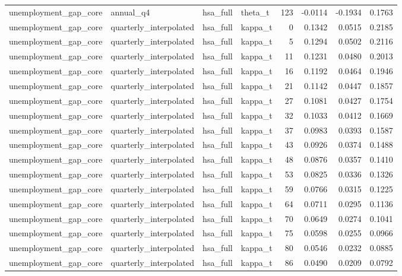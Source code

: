 \begin{tabular}{llllrrrr}
unemployment\_gap\_core & annual\_q4 & hsa\_full & theta\_t & 123 & -0.0114 & -0.1934 & 0.1763 \\
unemployment\_gap\_core & quarterly\_interpolated & hsa\_full & kappa\_t & 0 & 0.1342 & 0.0515 & 0.2185 \\
unemployment\_gap\_core & quarterly\_interpolated & hsa\_full & kappa\_t & 5 & 0.1294 & 0.0502 & 0.2116 \\
unemployment\_gap\_core & quarterly\_interpolated & hsa\_full & kappa\_t & 11 & 0.1231 & 0.0480 & 0.2013 \\
unemployment\_gap\_core & quarterly\_interpolated & hsa\_full & kappa\_t & 16 & 0.1192 & 0.0464 & 0.1946 \\
unemployment\_gap\_core & quarterly\_interpolated & hsa\_full & kappa\_t & 21 & 0.1142 & 0.0447 & 0.1857 \\
unemployment\_gap\_core & quarterly\_interpolated & hsa\_full & kappa\_t & 27 & 0.1081 & 0.0427 & 0.1754 \\
unemployment\_gap\_core & quarterly\_interpolated & hsa\_full & kappa\_t & 32 & 0.1033 & 0.0412 & 0.1669 \\
unemployment\_gap\_core & quarterly\_interpolated & hsa\_full & kappa\_t & 37 & 0.0983 & 0.0393 & 0.1587 \\
unemployment\_gap\_core & quarterly\_interpolated & hsa\_full & kappa\_t & 43 & 0.0926 & 0.0374 & 0.1488 \\
unemployment\_gap\_core & quarterly\_interpolated & hsa\_full & kappa\_t & 48 & 0.0876 & 0.0357 & 0.1410 \\
unemployment\_gap\_core & quarterly\_interpolated & hsa\_full & kappa\_t & 53 & 0.0825 & 0.0336 & 0.1326 \\
unemployment\_gap\_core & quarterly\_interpolated & hsa\_full & kappa\_t & 59 & 0.0766 & 0.0315 & 0.1225 \\
unemployment\_gap\_core & quarterly\_interpolated & hsa\_full & kappa\_t & 64 & 0.0711 & 0.0295 & 0.1136 \\
unemployment\_gap\_core & quarterly\_interpolated & hsa\_full & kappa\_t & 70 & 0.0649 & 0.0274 & 0.1041 \\
unemployment\_gap\_core & quarterly\_interpolated & hsa\_full & kappa\_t & 75 & 0.0598 & 0.0255 & 0.0966 \\
unemployment\_gap\_core & quarterly\_interpolated & hsa\_full & kappa\_t & 80 & 0.0546 & 0.0232 & 0.0885 \\
unemployment\_gap\_core & quarterly\_interpolated & hsa\_full & kappa\_t & 86 & 0.0490 & 0.0209 & 0.0792 \\

\end{tabular}
